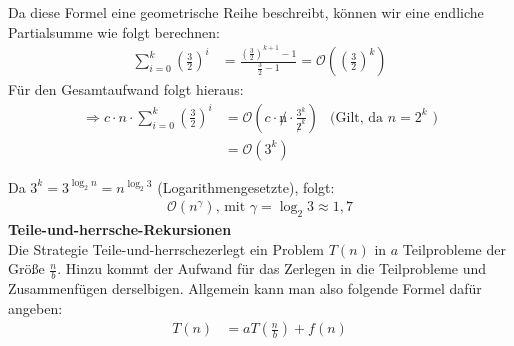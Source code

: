 Da diese Formel eine geometrische Reihe beschreibt, können wir eine endliche Partialsumme wie folgt berechnen:\\
\begin{align*}
    \sum\limits_{i=0}^k \left(\frac{3}{2}\right)^i&= \frac{\left(\frac{3}{2}\right)^{k+1}-1}{\frac{3}{2}-1}=\mathcal{O}\left(\left(\frac{3}{2}\right)^k\right)
\end{align*}
Für den Gesamtaufwand folgt hieraus:\\
\begin{align*}
    \Rightarrow c\cdot n\cdot\sum\limits_{i=0}^k \left(\frac{3}{2}\right)^i&=\mathcal{O}\left(c\cdot \not n \cdot \frac{3^k}{\not 2^k}\right)&\text{(Gilt, da } n=2^k\text{ )}\\
                                                                           &=\mathcal{O}\left(3^k\right)
\end{align*}

Da $3^k = 3^{\log_2n} = n^{\log_2 3}$ (Logarithmengesetzte), folgt:\\
\begin{align*}
    \mathcal{O}\left(n^\gamma\right)\text{, mit } \gamma = \log_2 3 \approx 1,7
\end{align*}
\textbf{Teile-und-herrsche-Rekursionen}\\
Die Strategie \glqq Teile-und-herrsche\grqq zerlegt ein Problem $T(n)$ in $a$ Teilprobleme der Größe $\frac{n}{b}$. Hinzu kommt der Aufwand für das Zerlegen in die Teilprobleme und Zusammenfügen derselbigen. Allgemein kann man also folgende Formel dafür angeben:\\
\begin{align*}
    T(n)&= a T(\frac{n}{b})+f(n)\\
\end{align*}

